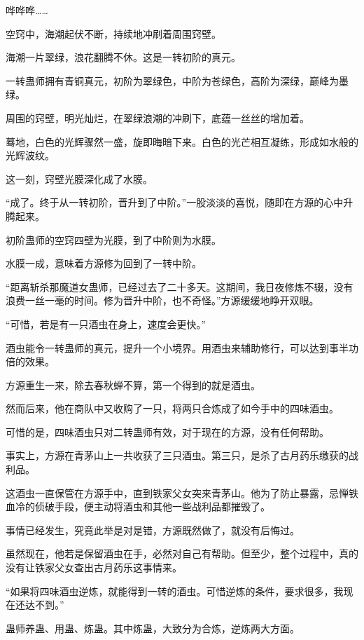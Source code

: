 
\begin{this_body}

哗哗哗……

空窍中，海潮起伏不断，持续地冲刷着周围窍壁。

海潮一片翠绿，浪花翻腾不休。这是一转初阶的真元。

一转蛊师拥有青铜真元，初阶为翠绿色，中阶为苍绿色，高阶为深绿，巅峰为墨绿。

周围的窍壁，明光灿烂，在翠绿浪潮的冲刷下，底蕴一丝丝的增加着。

蓦地，白色的光辉骤然一盛，旋即晦暗下来。白色的光芒相互凝练，形成如水般的光辉波纹。

这一刻，窍壁光膜深化成了水膜。

“成了。终于从一转初阶，晋升到了中阶。”一股淡淡的喜悦，随即在方源的心中升腾起来。

初阶蛊师的空窍四壁为光膜，到了中阶则为水膜。

水膜一成，意味着方源修为回到了一转中阶。

“距离斩杀那魔道女蛊师，已经过去了二十多天。这期间，我日夜修炼不辍，没有浪费一丝一毫的时间。修为晋升中阶，也不奇怪。”方源缓缓地睁开双眼。

“可惜，若是有一只酒虫在身上，速度会更快。”

酒虫能令一转蛊师的真元，提升一个小境界。用酒虫来辅助修行，可以达到事半功倍的效果。

方源重生一来，除去春秋蝉不算，第一个得到的就是酒虫。

然而后来，他在商队中又收购了一只，将两只合炼成了如今手中的四味酒虫。

可惜的是，四味酒虫只对二转蛊师有效，对于现在的方源，没有任何帮助。

事实上，方源在青茅山上一共收获了三只酒虫。第三只，是杀了古月药乐缴获的战利品。

这酒虫一直保管在方源手中，直到铁家父女突来青茅山。他为了防止暴露，忌惮铁血冷的侦破手段，便主动将酒虫和其他一些战利品都摧毁了。

事情已经发生，究竟此举是对是错，方源既然做了，就没有后悔过。

虽然现在，他若是保留酒虫在手，必然对自己有帮助。但至少，整个过程中，真的没有让铁家父女查出古月药乐这事情来。

“如果将四味酒虫逆炼，就能得到一转的酒虫。可惜逆炼的条件，要求很多，我现在还达不到。”

蛊师养蛊、用蛊、炼蛊。其中炼蛊，大致分为合炼，逆炼两大方面。


\end{this_body}

